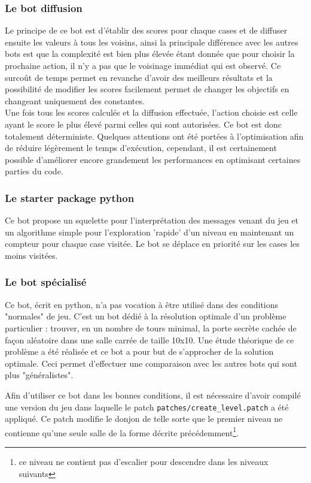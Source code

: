 \documentclass[a4paper,12pt]{article}
\begin{document}
\subsubsection{Le bot diffusion}
Le principe de ce bot est d'établir des scores pour chaque cases et de diffuser
ensuite les valeurs à tous les voisins, ainsi la principale différence avec les
autres bots est que la complexité est bien plus élevée étant donnée que pour
choisir la prochaine action, il n'y a pas que le voisinage immédiat qui est
observé. Ce surcoût de temps permet en revanche d'avoir des meilleurs résultats
et la possibilité de modifier les scores facilement permet de changer les
objectifs en changeant uniquement des constantes.
\\
Une fois tous les scores calculés et la diffusion effectuée, l'action choisie
est celle ayant le score le plus élevé parmi celles qui sont autorisées. Ce bot
est donc totalement déterministe. Quelques attentions ont été portées à
l'optimisation afin de réduire légèrement le temps d'exécution, cependant, il
est certainement possible d'améliorer encore grandement les performances en
optimisant certaines parties du code.

\subsubsection{Le starter package python}

Ce bot propose un squelette pour l'interprétation des messages venant du jeu
et un algorithme simple pour l'exploration 'rapide' d'un niveau en maintenant
un compteur pour chaque case visitée. Le bot se déplace en priorité sur les
cases les moins visitées.

\subsubsection{Le bot spécialisé}

Ce bot, écrit en python, n'a pas vocation à être utilisé dans des conditions
"normales" de jeu. C'est un bot dédié à la résolution optimale d'un problème
particulier : trouver, en un nombre de tours minimal, la porte secrète cachée
de façon aléatoire dans une salle carrée de taille 10x10. Une étude théorique
de ce problème a été réalisée et ce bot a pour but de s'approcher de la
solution optimale. Ceci permet d'effectuer une comparaison avec les autres
bots qui sont plus "généralistes".

Afin d'utiliser ce bot dans les bonnes conditions, il est nécessaire d'avoir
compilé une version du jeu dans laquelle le patch
{\verb|patches/create_level.patch|} a été appliqué. Ce patch modifie le donjon
de telle sorte que le premier niveau ne contienne qu'une seule salle de la
forme décrite précédemment\footnote{ce niveau ne contient pas d'escalier pour
descendre dans les niveaux suivants}.
\end{document}
